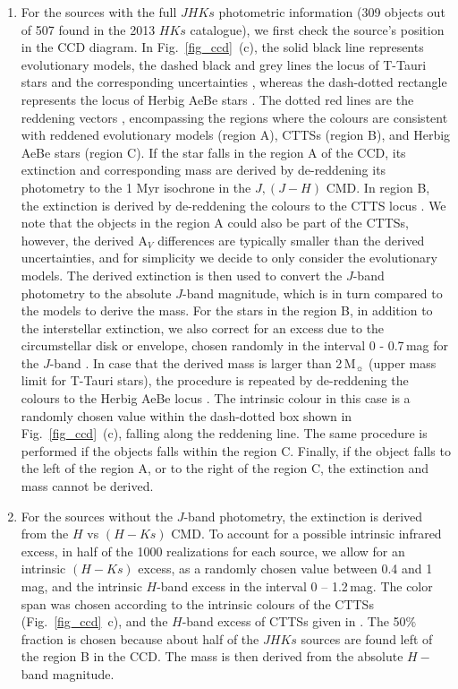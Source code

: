 \documentclass[a4paper,fleqn,usenatbib]{mnras}
\begin{document}
\begin{enumerate}
\item For the sources with the full $JHKs$ photometric information (309 objects out of 507 found in the 2013 $HKs$ catalogue), 
we first check the source's position in the CCD diagram.  
In Fig.~\ref{fig_ccd}~(c), the solid black line represents evolutionary models, the dashed black and grey lines
the locus of T-Tauri stars and the corresponding uncertainties \citep{meyer97}, whereas the dash-dotted rectangle represents the locus of 
Herbig AeBe stars \citep{hernandez05}. The dotted red lines are the reddening vectors \citep{cardelli89}, encompassing the
regions where the colours are consistent with reddened evolutionary models (region A), CTTSs (region B), and Herbig AeBe stars (region C).
If the star falls in the region A of the CCD, its extinction and corresponding mass are derived by de-reddening its photometry to the
1 Myr isochrone in the $J, (J-H)$ CMD. In region B, the extinction is derived by de-reddening the colours to the CTTS locus \citep{meyer97}. 
We note that the objects in the region A could also be part of the CTTSs, however, the derived A$_V$ differences are typically smaller than
the derived uncertainties, and for simplicity we decide to only consider the evolutionary models.
The derived extinction is then used to convert the $J$-band photometry to the absolute $J$-band magnitude, which is in turn compared to the 
models to derive the mass. 
For the stars in the region B, in addition to the interstellar extinction, we also correct for an excess due to the 
circumstellar disk or envelope, chosen randomly in the interval 0 - 0.7\,mag for the $J$-band \citep{cieza05}.
In case that the derived mass is larger than 2\,M$_{\sun}$ (upper mass limit for T-Tauri stars), 
the procedure is repeated by de-reddening the colours to the Herbig AeBe locus \citep{hernandez05}. The intrinsic colour in this case is a randomly 
chosen value within the dash-dotted box shown in Fig.~\ref{fig_ccd}~(c), falling along the reddening line. The same procedure is 
performed if the objects falls within the region C. Finally, if the object falls to the left of the region A, or to the right of the region C, the extinction
and mass cannot be derived. 

\item
For the sources without the $J$-band photometry, the extinction is derived from the $H$ vs $(H-Ks)$ CMD. 
To account for a possible intrinsic infrared excess, in half of the 1000 realizations for each source, we allow for an intrinsic $(H-Ks)$ excess, as a randomly chosen value between 0.4 and 1\,mag, and the intrinsic $H$-band excess in the interval 0 -- 1.2\,mag.
The color span was chosen according to the intrinsic colours of the CTTSs (Fig.~\ref{fig_ccd}~c), and the $H$-band excess of 
CTTSs given in \citet{cieza05}.
The 50$\%$ fraction is chosen because about half of the $JHKs$ sources are found left of the region B in the CCD.  
The mass is then derived from the absolute $H-$band magnitude.


\end{enumerate}
\end{document}
